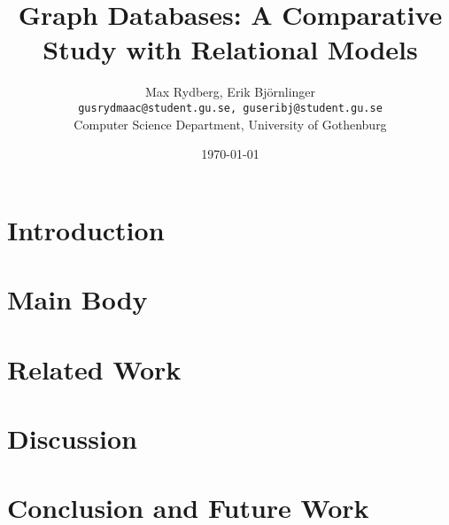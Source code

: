 \documentclass[12pt, a4paper]{article}
\title{Graph Databases: A Comparative Study with Relational Models}
\author{
  Max Rydberg, Erik Björnlinger \\
  \texttt{gusrydmaac@student.gu.se, guseribj@student.gu.se} \\
  Computer Science Department, University of Gothenburg 
}
\date{\today}
\begin{document}
% 
\maketitle

\begin{abstract}

\end{abstract}

\section{Introduction}


\section{Main Body}


\section{Related Work}


\section{Discussion}


\section{Conclusion and Future Work}

\end{document}

